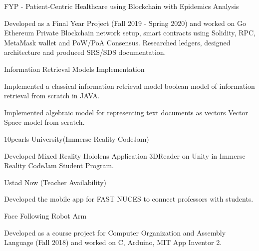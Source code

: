 
\begin{cventries}
  \cventry
    {FYP - Patient-Centric Healthcare using Blockchain with Epidemics Analysis} %
    {} %
    {} %
    {} %
    {
      \begin{cvitems} %
        \item {Developed as a Final Year Project (Fall 2019 - Spring 2020) and worked on Go Ethereum Private Blockchain network setup, smart contracts using Solidity, RPC, MetaMask wallet and PoW/PoA Consensus. Researched ledgers, designed architecture and produced SRS/SDS documentation.}
      \end{cvitems}
    }

  \cventry
    {Information Retrieval Models Implementation} %
    {} %
    {} %
    {} %
    {
      \begin{cvitems} %
      	\item {Implemented a classical information retrieval model boolean model of information retrieval from scratch in JAVA.}
		\item {Implemented algebraic model for representing text documents as vectors Vector Space model from scratch.}
      \end{cvitems}
    }
 
     \cventry
    {10pearls University(Immerse Reality CodeJam)} %
    {} %
    {} %
    {} %
    {
      \begin{cvitems} %
      	\item {Developed Mixed Reality Hololens Application 3DReader on Unity  in Immerse Reality CodeJam Student Program.}
      \end{cvitems}
    }
    
    \cventry
    {Ustad Now (Teacher Availability) } %
    {} %
    {} %
    {} %
    {
      \begin{cvitems} %
      	\item {Developed the mobile app for FAST NUCES to connect professors with students.}
      \end{cvitems}
    }
    
    \cventry
    {Face Following Robot Arm} %
    {} %
    {} %
    {} %
    {
      \begin{cvitems} %
      	\item {Developed as a course project for Computer Organization and Assembly Language (Fall 2018) and worked on C, Arduino, MIT App Inventor 2.}
      \end{cvitems}
    }
\end{cventries}